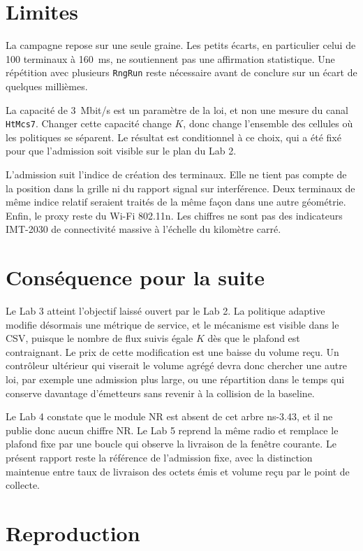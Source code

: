 \documentclass[11pt,a4paper]{article}
\begin{document}
\section{Limites}

La campagne repose sur une seule graine. Les petits écarts, en particulier celui de 100 terminaux à 160~ms, ne soutiennent pas une affirmation statistique. Une répétition avec plusieurs \texttt{RngRun} reste nécessaire avant de conclure sur un écart de quelques millièmes.

La capacité de 3~Mbit/s est un paramètre de la loi, et non une mesure du canal \texttt{HtMcs7}. Changer cette capacité change $K$, donc change l'ensemble des cellules où les politiques se séparent. Le résultat est conditionnel à ce choix, qui a été fixé pour que l'admission soit visible sur le plan du Lab 2.

L'admission suit l'indice de création des terminaux. Elle ne tient pas compte de la position dans la grille ni du rapport signal sur interférence. Deux terminaux de même indice relatif seraient traités de la même façon dans une autre géométrie. Enfin, le proxy reste du Wi-Fi 802.11n. Les chiffres ne sont pas des indicateurs IMT-2030 de connectivité massive à l'échelle du kilomètre carré.

\section{Conséquence pour la suite}

Le Lab 3 atteint l'objectif laissé ouvert par le Lab 2. La politique adaptive modifie désormais une métrique de service, et le mécanisme est visible dans le CSV, puisque le nombre de flux suivis égale $K$ dès que le plafond est contraignant. Le prix de cette modification est une baisse du volume reçu. Un contrôleur ultérieur qui viserait le volume agrégé devra donc chercher une autre loi, par exemple une admission plus large, ou une répartition dans le temps qui conserve davantage d'émetteurs sans revenir à la collision de la baseline.

Le Lab 4 constate que le module NR est absent de cet arbre ns-3.43, et il ne publie donc aucun chiffre NR. Le Lab 5 reprend la même radio et remplace le plafond fixe par une boucle qui observe la livraison de la fenêtre courante. Le présent rapport reste la référence de l'admission fixe, avec la distinction maintenue entre taux de livraison des octets émis et volume reçu par le point de collecte.

\section{Reproduction}
\end{document}
